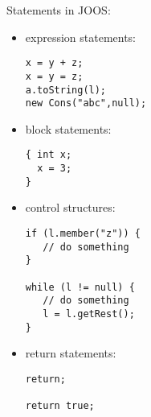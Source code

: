 \begin{slide*}
Statements in JOOS:

\begin{itemize}
\item expression statements:

\begin{scriptsize}
\begin{verbatim}
x = y + z;
x = y = z;
a.toString(l);
new Cons("abc",null);
\end{verbatim}
\end{scriptsize}

\item  block statements:

\begin{scriptsize}
\begin{verbatim}
{ int x;
  x = 3;
}
\end{verbatim}
\end{scriptsize}

\item control structures:

\begin{scriptsize}
\begin{verbatim}
if (l.member("z")) { 
   // do something 
}

while (l != null) { 
   // do something
   l = l.getRest();
}
\end{verbatim}
\end{scriptsize}

\item return statements:

\begin{scriptsize}
\begin{verbatim}
return;

return true;
\end{verbatim}
\end{scriptsize}

\end{itemize}
\vfil
\end{slide*}


